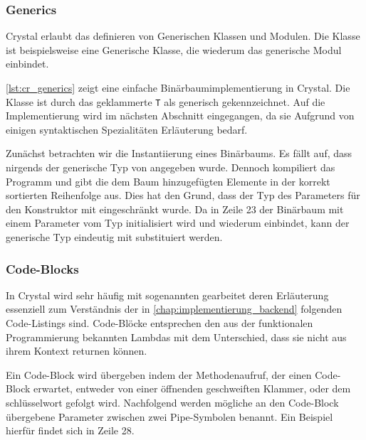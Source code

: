 \subsubsection{Generics}
\label{sssec:gsc_generics}

Crystal erlaubt das definieren von Generischen Klassen und Modulen.  Die Klasse
 ist beispielsweise eine Generische Klasse, die wiederum das
generische Modul  einbindet.

\cref{lst:cr_generics} zeigt eine einfache Binärbaumimplementierung in Crystal.
Die Klasse  ist durch das geklammerte \texttt{T} als generisch
gekennzeichnet.  Auf die Implementierung wird im nächsten Abschnitt eingegangen,
da sie Aufgrund von einigen syntaktischen Spezialitäten Erläuterung bedarf.

Zunächst betrachten wir die Instantiierung eines Binärbaums.  Es fällt auf, dass
nirgends der generische Typ von  angegeben wurde.  Dennoch
kompiliert das Programm und gibt die dem Baum hinzugefügten Elemente in der
korrekt sortierten Reihenfolge aus.  Dies hat den Grund, dass der Typ des
Parameters für den Konstruktor mit  eingeschränkt wurde.  Da
in Zeile 23 der Binärbaum mit einem Parameter vom Typ 
initialisiert wird und  wiederum 
einbindet, kann der generische Typ eindeutig mit  substituiert
werden.



\subsubsection{Code-Blocks}
\label{sssec:gsc_code_blocks}

In Crystal wird sehr häufig mit sogenannten 
gearbeitet deren Erläuterung essenziell zum Verständnis der in
\cref{chap:implementierung_backend} folgenden Code-Listings sind.  Code-Blöcke
entsprechen den aus der funktionalen Programmierung bekannten Lambdas mit dem
Unterschied, dass sie nicht aus ihrem Kontext returnen können.

Ein Code-Block wird übergeben indem der Methodenaufruf, der einen Code-Block
erwartet, entweder von einer öffnenden geschweiften Klammer, oder dem
schlüsselwort  gefolgt wird.  Nachfolgend werden mögliche an den
Code-Block übergebene Parameter zwischen zwei Pipe-Symbolen benannt.  Ein
Beispiel hierfür findet sich in Zeile 28.

